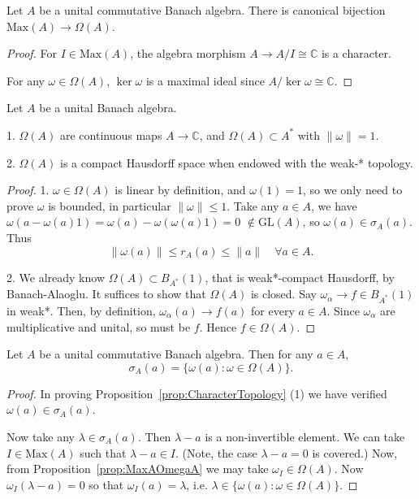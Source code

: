 \begin{proposition}	
	\label{prop:MaxAOmegaA}
	Let $A$ be a unital commutative Banach algebra.
	There is canonical bijection $\text{Max}(A) \to \Omega(A)$.
\end{proposition}
\begin{proof}
	For $I \in \text{Max}(A)$, the algebra morphism $A \to A / I \cong \mathbb{C}$ is a character. 

	For any $\omega \in \Omega(A)$, $\operatorname{ker} \omega$ is a maximal ideal since $A / \operatorname{ker} \omega \cong \mathbb{C}$.
\end{proof}

\begin{proposition}
	\label{prop:CharacterTopology}
	Let $A$ be a unital Banach algebra.

	1. $\Omega(A)$ are continuous maps $A \to \mathbb{C}$, and $\Omega(A) \subset A^*$ with $\|\omega\| = 1$.

	2. $\Omega(A)$ is a compact Hausdorff space when endowed with the weak-* topology. 
\end{proposition}
\begin{proof}
	1. $\omega \in \Omega(A)$ is linear by definition, and $\omega(1) = 1$, so we only need to prove $\omega$ is bounded, in particular $\|\omega\| \le 1$. Take any $a \in A$, we have $\omega(a - \omega(a)1) = \omega(a) - \omega(\omega(a)1) = 0$ $\not\in \text{GL}(A)$, so $\omega(a) \in \sigma_A(a)$. Thus
	\[
		\|\omega(a)\|\le r_A(a) \le \|a\| \quad \forall a \in A
	.\] 

	2. We already know $\Omega\left(A \right) \subset B_{A^*}(1)$, that is weak*-compact Hausdorff, by Banach-Alaoglu. It suffices to show that $\Omega(A)$ is closed. Say $\omega_\alpha \to f \in B_{A^*}(1)$ in weak*. Then, by definition, $\omega_\alpha(a) \to f(a)$ for every $a \in A$. Since $\omega_\alpha$ are multiplicative and unital, so must be  $f$. Hence $f \in \Omega(A)$.
\end{proof}

\begin{proposition}
	\label{prop:CharacterSpectrum}
	Let $A$ be a unital commutative Banach algebra. Then for any $a \in A$,
	\[
		\sigma_A(a) = \{\omega(a): \omega \in \Omega(A)\} 
	.\] 
\end{proposition}
\begin{proof}
	In proving Proposition~\ref{prop:CharacterTopology} (1) we have verified $\omega(a) \in \sigma_A(a)$. 

	Now take any $\lambda \in \sigma_A(a)$. Then $\lambda - a $ is a non-invertible element. We can take $I \in \text{Max}(A)$ such that $\lambda - a \in I$. (Note, the case $\lambda - a =0$ is covered.) 
	Now, from Proposition~\ref{prop:MaxAOmegaA} we may take $\omega_I \in \Omega(A)$. Now $\omega_I(\lambda - a) = 0$ so that $\omega_I(a) = \lambda$, i.e. $\lambda \in \{\omega(a): \omega \in \Omega(A)\} $.
\end{proof}


